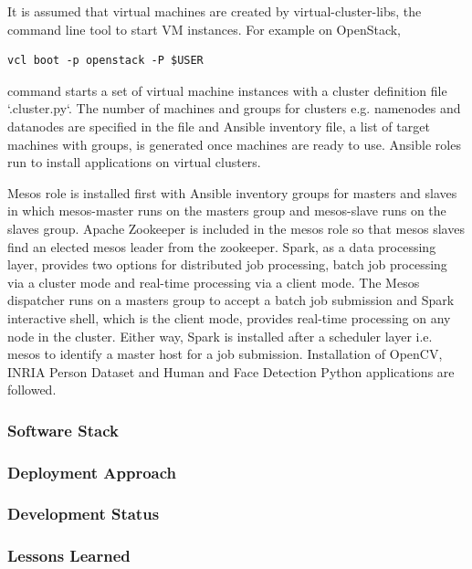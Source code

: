 \documentclass[9pt,twocolumn,twoside]{styles/osajnl}
\begin{document}
It is assumed that virtual machines are created by
virtual-cluster-libs, the command line tool to start VM instances. For
example on OpenStack, 

\begin{verbatim} 
vcl boot -p openstack -P $USER
\end{verbatim}

command starts a set of virtual machine instances with a cluster definition file `.cluster.py`. The number of machines and groups for clusters e.g. namenodes and datanodes are specified in the file and Ansible inventory file, a list of target machines with groups, is generated once machines are ready to use. Ansible roles run to install applications on virtual clusters.


Mesos role is installed first with Ansible inventory groups for masters and slaves in which mesos-master runs on the masters group and mesos-slave runs on the slaves group. Apache Zookeeper is included in the mesos role so that mesos slaves find an elected mesos leader from the zookeeper. Spark, as a data processing layer, provides two options for distributed job processing, batch job processing via a cluster mode and real-time processing via a client mode. The Mesos dispatcher runs on a masters group to accept a batch job submission and Spark interactive shell, which is the client mode, provides real-time processing on any node in the cluster. Either way, Spark is installed after a scheduler layer i.e. mesos to identify a master host for a job submission. Installation of OpenCV, INRIA Person Dataset and Human and Face Detection Python applications are followed.
\subsubsection{Software Stack}

\subsubsection{Deployment Approach}

\subsubsection{Development Status}

\subsubsection{Lessons Learned}
\end{document}
